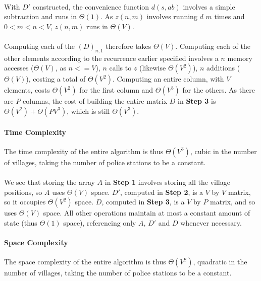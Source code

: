 \documentclass[twocolumn]{article}
\begin{document}
		\paragraph{}
		With $D'$ constructed, the convenience function $d(s, a b)$ involves a simple subtraction and runs in $\Theta(1)$. As $z(n, m)$ involves running $d$ $m$ times and $0 < m < n < V$, $z(n, m)$ runs in $\Theta(V)$.
		
		\paragraph{}
		Computing each of the $(D)_{n, 1}$ therefore takes $\Theta(V)$. Computing each of the other elements according to the recurrence earlier specified involves a $n$ memory accesses ($\Theta(V)$, as $n <= V$), $n$ calls to $z$ (likewise $\Theta(V^2)$), $n$ additions ($\Theta(V)$), costing a total of $\Theta(V^2)$. Computing an entire column, with $V$ elements, costs $\Theta(V^2)$ for the first column and $\Theta(V^3)$ for the others. As there are $P$ columns, the cost of building the entire matrix $D$ in \textbf{Step 3} is $\Theta(V^2) + \Theta(P V^3)$, which is still $\Theta(V^3)$.
		
		\paragraph{Time Complexity}
		The time complexity of the entire algorithm is thus $\Theta(V^3)$, cubic in the number of villages, taking the number of police stations to be a constant.
		
		\paragraph{}
		We see that storing the array $A$ in \textbf{Step 1} involves storing all the village positions, so $A$ uses $\Theta(V)$ space. $D'$, computed in \textbf{Step 2}, is a $V$ by $V$ matrix, so it occupies $\Theta(V^2)$ space. $D$, computed in \textbf{Step 3}, is a $V$ by $P$ matrix, and so uses $\Theta(V)$ space. All other operations maintain at most a constant amount of state (thus $\Theta(1)$ space), referencing only $A$, $D'$ and $D$ whenever necessary.
		
		\paragraph{Space Complexity}
		The space complexity of the entire algorithm is thus $\Theta(V^2)$, quadratic in the number of villages, taking the number of police stations to be a constant.
	
	
\end{document}
